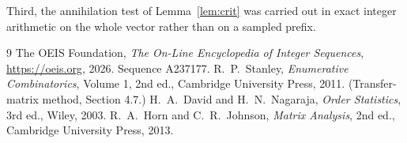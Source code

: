 \documentclass[11pt,a4paper]{article}
\theoremstyle{plain}
\theoremstyle{definition}
\begin{document}
Third, the annihilation test of Lemma~\ref{lem:crit} was carried out in exact integer
arithmetic on the whole vector rather than on a sampled prefix.

\begin{thebibliography}{9}
 The OEIS Foundation, \emph{The On-Line Encyclopedia of Integer
Sequences}, \url{https://oeis.org}, 2026. Sequence A237177.
 R.~P.~Stanley, \emph{Enumerative Combinatorics}, Volume 1, 2nd ed.,
Cambridge University Press, 2011. (Transfer-matrix method, Section 4.7.)
 H.~A.~David and H.~N.~Nagaraja, \emph{Order Statistics}, 3rd ed., Wiley,
2003.
 R.~A.~Horn and C.~R.~Johnson, \emph{Matrix Analysis}, 2nd ed., Cambridge
University Press, 2013.
\end{thebibliography}
\end{document}
